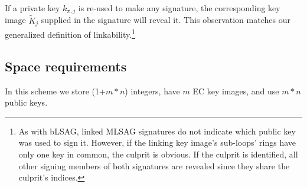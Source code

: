 If a private key \(k_{\pi, j}\) is re-used to make any signature, the corresponding key image \(\tilde{K}_j\) supplied in the signature will reveal it. This observation matches our generalized definition of linkability.\footnote{As with bLSAG, linked MLSAG signatures do not indicate which public key was used to sign it. However, if the linking key image's sub-loops' rings have only one key in common, the culprit is obvious. If the culprit is identified, all other signing members of both signatures are revealed since they share the culprit's indices.}


\subsection*{Space requirements}

In this scheme we store (1+$m*n$) integers, have $m$ EC key images, and use $m*n$ public keys.
